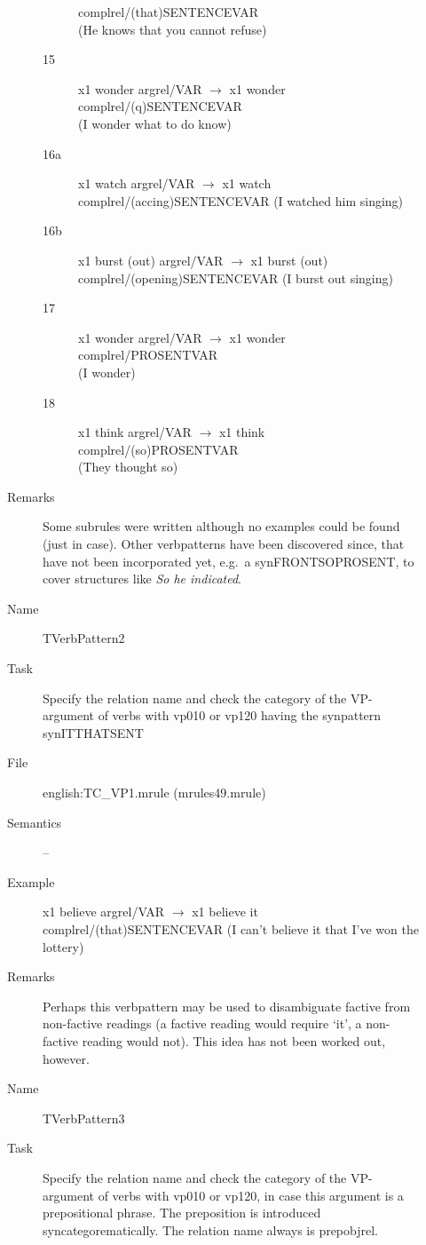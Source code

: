 \begin{description}
\begin{description}
\begin{description}
complrel/(that)SENTENCEVAR \\
(He knows that you cannot refuse)
  \item[15] x1 wonder argrel/VAR $\rightarrow$ x1 wonder
complrel/(q)SENTENCEVAR \\
(I wonder what to do know)
  \item[16a] x1 watch argrel/VAR $\rightarrow$ x1 watch
complrel/(accing)SENTENCEVAR 
(I watched him singing)
  \item[16b] x1 burst (out) argrel/VAR $\rightarrow$ x1 burst (out)
complrel/(opening)SENTENCEVAR 
(I burst out singing)
  \item[17] x1 wonder argrel/VAR $\rightarrow$ x1 wonder
complrel/PROSENTVAR \\
(I wonder)
  \item[18] x1 think argrel/VAR $\rightarrow$ x1 think 
complrel/(so)PROSENTVAR \\
(They thought so)
  \end{description}
\item[Remarks] Some subrules were written although no examples could be found
(just in case). Other verbpatterns have been discovered since, that have not 
been incorporated yet, e.g.\ a synFRONTSOPROSENT, to 
cover structures like {\em So he indicated\/}. 
\end{description}

\vspace{1 cm}
\begin{description}
\item[Name] TVerbPattern2
\item[Task] Specify the relation name and check the category of the VP-argument of 
verbs with vp010 or vp120 having the synpattern synITTHATSENT
\item[File] english:TC\_VP1.mrule (mrules49.mrule)
\item[Semantics] --
\item[Example] x1 believe argrel/VAR $\rightarrow$ x1 believe it 
complrel/(that)SENTENCEVAR 
(I can't believe it that I've won the lottery)
\item[Remarks] Perhaps this verbpattern may be used to disambiguate factive 
from non-factive readings (a factive reading would require `it', a non-factive
reading would not). This idea has not been worked out, however.
\end{description}

\vspace{1 cm}
\begin{description}
\item[Name] TVerbPattern3
\item[Task] Specify the relation name and check the category of the VP-argument of 
verbs with vp010 or vp120, in case this argument is a prepositional phrase. The 
preposition is introduced syncategorematically. The relation name always is 
prepobjrel.


\end{description}
\end{description}
